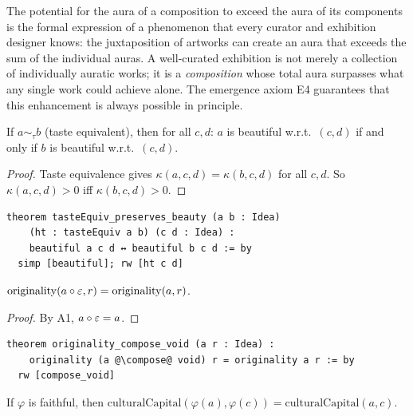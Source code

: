\begin{interpretation}
\label{int:aura-compose}
The potential for the aura of a composition to exceed the aura of its
components is the formal expression of a phenomenon that every curator
and exhibition designer knows: the juxtaposition of artworks can
create an aura that exceeds the sum of the individual auras.  A
well-curated exhibition is not merely a collection of individually
auratic works; it is a \emph{composition} whose total aura surpasses
what any single work could achieve alone.  The emergence axiom E4
guarantees that this enhancement is always possible in principle.
\end{interpretation}

\begin{theorem}
\label{thm:taste-equiv-beauty}
If $a \sim_{\tau} b$ (taste equivalent), then for all $c, d$:
$a$ is beautiful w.r.t.\ $(c, d)$ if and only if $b$ is beautiful
w.r.t.\ $(c, d)$.
\end{theorem}

\begin{proof}
Taste equivalence gives $\kappa(a, c, d) = \kappa(b, c, d)$ for all $c, d$.
So $\kappa(a, c, d) > 0$ iff $\kappa(b, c, d) > 0$.
\end{proof}

\begin{lstlisting}
theorem tasteEquiv_preserves_beauty (a b : Idea)
    (ht : tasteEquiv a b) (c d : Idea) :
    beautiful a c d ↔ beautiful b c d := by
  simp [beautiful]; rw [ht c d]
\end{lstlisting}

\begin{theorem}
\label{thm:originality-void}
$\mathrm{originality}(a \circ \varepsilon, r) = \mathrm{originality}(a, r)$.
\end{theorem}

\begin{proof}
By A1, $a \circ \varepsilon = a$.
\end{proof}

\begin{lstlisting}
theorem originality_compose_void (a r : Idea) :
    originality (a @\compose@ void) r = originality a r := by
  rw [compose_void]
\end{lstlisting}

\begin{theorem}
\label{thm:capital-faithful}
If $\varphi$ is faithful, then
$\mathrm{culturalCapital}(\varphi(a), \varphi(c)) =
 \mathrm{culturalCapital}(a, c)$.
\end{theorem}

